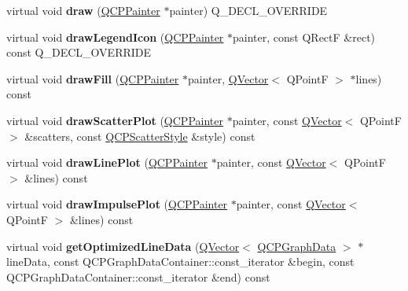 \begin{DoxyCompactItemize}
\item 
virtual void {\bfseries draw} (\hyperlink{class_q_c_p_painter}{Q\+C\+P\+Painter} $\ast$painter) Q\+\_\+\+D\+E\+C\+L\+\_\+\+O\+V\+E\+R\+R\+I\+DE\hypertarget{class_q_c_p_graph_a96b5797ede88bb067e002bbb2856826b}{}\label{class_q_c_p_graph_a96b5797ede88bb067e002bbb2856826b}

\item 
virtual void {\bfseries draw\+Legend\+Icon} (\hyperlink{class_q_c_p_painter}{Q\+C\+P\+Painter} $\ast$painter, const Q\+RectF \&rect) const Q\+\_\+\+D\+E\+C\+L\+\_\+\+O\+V\+E\+R\+R\+I\+DE\hypertarget{class_q_c_p_graph_aae25a7748d571580fbefd4cec1444526}{}\label{class_q_c_p_graph_aae25a7748d571580fbefd4cec1444526}

\item 
virtual void {\bfseries draw\+Fill} (\hyperlink{class_q_c_p_painter}{Q\+C\+P\+Painter} $\ast$painter, \hyperlink{class_q_vector}{Q\+Vector}$<$ Q\+PointF $>$ $\ast$lines) const \hypertarget{class_q_c_p_graph_a29ce3dfec2f1246a0abbab09b8f27224}{}\label{class_q_c_p_graph_a29ce3dfec2f1246a0abbab09b8f27224}

\item 
virtual void {\bfseries draw\+Scatter\+Plot} (\hyperlink{class_q_c_p_painter}{Q\+C\+P\+Painter} $\ast$painter, const \hyperlink{class_q_vector}{Q\+Vector}$<$ Q\+PointF $>$ \&scatters, const \hyperlink{class_q_c_p_scatter_style}{Q\+C\+P\+Scatter\+Style} \&style) const \hypertarget{class_q_c_p_graph_a33d51a1fa27c6a38e0d2dd63c3c7f468}{}\label{class_q_c_p_graph_a33d51a1fa27c6a38e0d2dd63c3c7f468}

\item 
virtual void {\bfseries draw\+Line\+Plot} (\hyperlink{class_q_c_p_painter}{Q\+C\+P\+Painter} $\ast$painter, const \hyperlink{class_q_vector}{Q\+Vector}$<$ Q\+PointF $>$ \&lines) const \hypertarget{class_q_c_p_graph_a2588e948b6223e4dc0e0069292a82a3f}{}\label{class_q_c_p_graph_a2588e948b6223e4dc0e0069292a82a3f}

\item 
virtual void {\bfseries draw\+Impulse\+Plot} (\hyperlink{class_q_c_p_painter}{Q\+C\+P\+Painter} $\ast$painter, const \hyperlink{class_q_vector}{Q\+Vector}$<$ Q\+PointF $>$ \&lines) const \hypertarget{class_q_c_p_graph_a761ebea8c82b0fee22d9833215b3f9f3}{}\label{class_q_c_p_graph_a761ebea8c82b0fee22d9833215b3f9f3}

\item 
virtual void {\bfseries get\+Optimized\+Line\+Data} (\hyperlink{class_q_vector}{Q\+Vector}$<$ \hyperlink{class_q_c_p_graph_data}{Q\+C\+P\+Graph\+Data} $>$ $\ast$line\+Data, const Q\+C\+P\+Graph\+Data\+Container\+::const\+\_\+iterator \&begin, const Q\+C\+P\+Graph\+Data\+Container\+::const\+\_\+iterator \&end) const \hypertarget{class_q_c_p_graph_ae3f5ccbbe21b0c295b977534614ba79b}{}\label{class_q_c_p_graph_ae3f5ccbbe21b0c295b977534614ba79b}


\end{DoxyCompactItemize}
